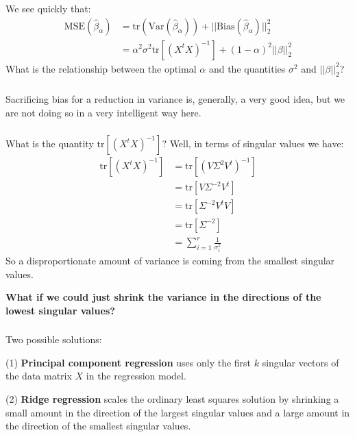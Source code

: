 \begin{frame}[fragile] \frametitle{}

We see quickly that:
\begin{align*}
\text{MSE} (\widehat{\beta}_{\alpha})
  &= \text{tr} (\text{Var}(\widehat{\beta}_{\alpha})) + ||\text{Bias}(\widehat{\beta}_{\alpha}) ||_2^2 \\
  &= \alpha^2 \sigma^2 \text{tr} \left[(X^t X)^{-1} \right] + (1-\alpha)^2 ||\beta||_2^2
\end{align*}
\pause What is the relationship between the optimal $\alpha$ and the quantities
$\sigma^2$ and $||\beta||_2^2$?

\end{frame}

\begin{frame}[fragile] \frametitle{}

\large
Sacrificing bias for a reduction in variance is, generally, a very
good idea, but we are not doing so in a very intelligent way here.

\end{frame}

\begin{frame}[fragile] \frametitle{}

What is the quantity $\text{tr} \left[(X^t X)^{-1} \right]$? \pause
Well, in terms of singular values we have:
\begin{align*}
\text{tr} \left[(X^t X)^{-1} \right]
&=\text{tr} \left[(V \Sigma^2 V^t)^{-1} \right] \\
&=\text{tr} \left[V \Sigma^{-2} V^t \right] \\
&=\text{tr} \left[\Sigma^{-2} V^t V \right] \\
&=\text{tr} \left[\Sigma^{-2} \right] \\
&=\sum_{i=1}^{r} \frac{1}{\sigma_i^2}
\end{align*}
\pause So a disproportionate amount of variance is coming from the
smallest singular values.

\pause \textbf{What if we could just shrink the variance in the
directions of the lowest singular values?}

\end{frame}

\begin{frame}[fragile] \frametitle{}

Two possible solutions:

(1) \textbf{Principal component regression} uses only the first
$k$ singular vectors of the data matrix $X$ in the regression
model.

(2) \textbf{Ridge regression} scales the ordinary least squares
solution by shrinking a small amount in the direction of the
largest singular values and a large amount in the direction of
the smallest singular values.

\end{frame}

